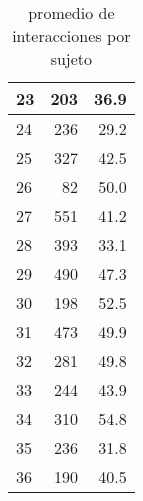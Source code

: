 \documentclass[spanish]{article}
\begin{document}
\begin{table}[h!]
\begin{center}
\begin{tabular}{|l|r|r|}
    23 &              203 &                      36.9\\ \hline
    24 &              236 &                      29.2\\ \hline
    25 &              327 &                      42.5\\ \hline
    26 &               82 &                      50.0\\ \hline
    27 &              551 &                      41.2\\ \hline
    28 &              393 &                      33.1\\ \hline
    29 &              490 &                      47.3\\ \hline
    30 &              198 &                      52.5\\ \hline
    31 &              473 &                      49.9\\ \hline
    32 &              281 &                      49.8\\ \hline
    33 &              244 &                      43.9\\ \hline
    34 &              310 &                      54.8\\ \hline
    35 &              236 &                      31.8\\ \hline
    36 &              190 &                      40.5\\ \hline
\end{tabular}
\caption{promedio de interacciones por sujeto}
\end{center}
\end{table}
\end{document}

